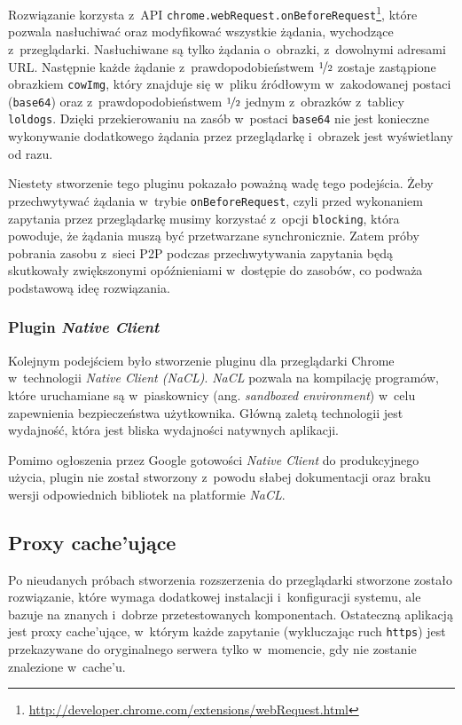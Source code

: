 \documentclass[a4paper,11pt]{scrartcl}
\newcommand{\f}{\texttt}
\newcommand{\keszu}{cache'u}
\newcommand{\keszujace}{cache'ujące}
\begin{document}
Rozwiązanie korzysta z~API \f{chrome.webRequest.onBeforeRequest}\footnote{\url{http://developer.chrome.com/extensions/webRequest.html}}, które pozwala nasłuchiwać oraz modyfikować wszystkie żądania, wychodzące z~przeglądarki. Nasłuchiwane są tylko żądania o~obrazki, z~dowolnymi adresami URL. Następnie każde żądanie z~prawdopodobieństwem $\nicefrac{1}{2}$ zostaje zastąpione obrazkiem \f{cowImg}, który znajduje się w~pliku źródłowym w~zakodowanej postaci (\f{base64}) oraz z~prawdopodobieństwem $\nicefrac{1}{2}$ jednym z~obrazków z~tablicy \f{loldogs}. Dzięki przekierowaniu na zasób w~postaci \f{base64} nie jest konieczne wykonywanie dodatkowego żądania przez przeglądarkę i~obrazek jest wyświetlany od razu. 

Niestety stworzenie tego pluginu pokazało poważną wadę tego podejścia. Żeby przechwytywać żądania w~trybie \f{onBeforeRequest}, czyli przed wykonaniem zapytania przez przeglądarkę musimy korzystać z~opcji \f{blocking}, która powoduje, że żądania muszą być przetwarzane synchronicznie. Zatem próby pobrania zasobu z~sieci P2P podczas przechwytywania zapytania będą skutkowały zwiększonymi opóźnieniami w~dostępie do zasobów, co podważa podstawową ideę rozwiązania.

\subsubsection{Plugin \textit{Native Client}}
\label{sect_plugin_2}
Kolejnym podejściem było stworzenie pluginu dla przeglądarki Chrome w~technologii \textit{Native Client (NaCL)}. \textit{NaCL} pozwala na kompilację programów, które uruchamiane są w~piaskownicy (ang. \textit{sandboxed environment}) w~celu zapewnienia bezpieczeństwa użytkownika. Główną zaletą technologii jest wydajność, która jest bliska wydajności natywnych aplikacji.

Pomimo ogłoszenia przez Google gotowości \textit{Native Client} do produkcyjnego użycia, plugin nie został stworzony z~powodu słabej dokumentacji oraz braku wersji odpowiednich bibliotek na platformie \textit{NaCL}.

\subsection{Proxy \keszujace}
\label{sect_impl_proxy}
Po nieudanych próbach stworzenia rozszerzenia do przeglądarki stworzone zostało rozwiązanie, które wymaga dodatkowej instalacji i~konfiguracji systemu, ale bazuje na znanych i~dobrze przetestowanych komponentach. Ostateczną aplikacją jest proxy \keszujace, w~którym każde zapytanie (wykluczając ruch \f{https}) jest przekazywane do oryginalnego serwera tylko w~momencie, gdy nie zostanie znalezione w~\keszu.
\end{document}

